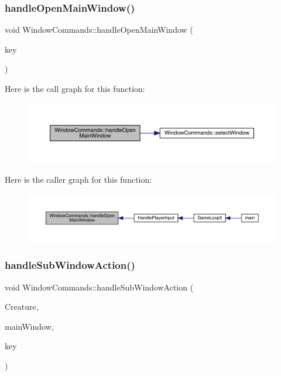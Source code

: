\subsubsection{\texorpdfstring{handle\+Open\+Main\+Window()}{handleOpenMainWindow()}}
{\footnotesize\ttfamily void Window\+Commands\+::handle\+Open\+Main\+Window (\begin{DoxyParamCaption}\item[{sf\+::\+Keyboard\+::\+Key}]{key }\end{DoxyParamCaption})}

Here is the call graph for this function\+:
\nopagebreak
\begin{figure}[H]
\begin{center}
\leavevmode
\includegraphics[width=350pt]{class_window_commands_a9b124a88e3af586738fe6b3cbce6fda2_cgraph}
\end{center}
\end{figure}
Here is the caller graph for this function\+:
\nopagebreak
\begin{figure}[H]
\begin{center}
\leavevmode
\includegraphics[width=350pt]{class_window_commands_a9b124a88e3af586738fe6b3cbce6fda2_icgraph}
\end{center}
\end{figure}
\mbox{\label{class_window_commands_a1c45c8c693e631b581eeb355176a49e7}} 
\subsubsection{\texorpdfstring{handle\+Sub\+Window\+Action()}{handleSubWindowAction()}}
{\footnotesize\ttfamily void Window\+Commands\+::handle\+Sub\+Window\+Action (\begin{DoxyParamCaption}\item[{\mbox{\hyperlink{class_base_creature}{Base\+Creature}} \&}]{Creature,  }\item[{\mbox{\hyperlink{class_data_window}{Data\+Window}} \&}]{main\+Window,  }\item[{sf\+::\+Keyboard\+::\+Key}]{key }\end{DoxyParamCaption})}

